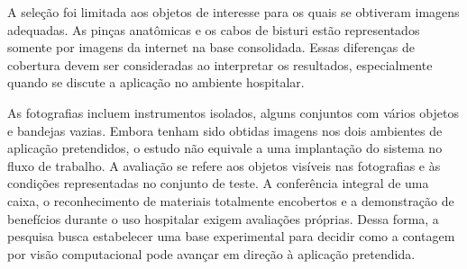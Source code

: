 A seleção foi limitada aos objetos de interesse para os quais se obtiveram imagens adequadas. As pinças anatômicas e os cabos de bisturi estão representados somente por imagens da internet na base consolidada. Essas diferenças de cobertura devem ser consideradas ao interpretar os resultados, especialmente quando se discute a aplicação no ambiente hospitalar.

As fotografias incluem instrumentos isolados, alguns conjuntos com vários objetos e bandejas vazias. Embora tenham sido obtidas imagens nos dois ambientes de aplicação pretendidos, o estudo não equivale a uma implantação do sistema no fluxo de trabalho. A avaliação se refere aos objetos visíveis nas fotografias e às condições representadas no conjunto de teste. A conferência integral de uma caixa, o reconhecimento de materiais totalmente encobertos e a demonstração de benefícios durante o uso hospitalar exigem avaliações próprias. Dessa forma, a pesquisa busca estabelecer uma base experimental para decidir como a contagem por visão computacional pode avançar em direção à aplicação pretendida.


\endgroup
